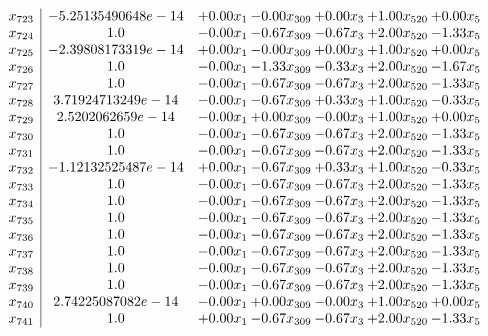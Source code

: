 \documentclass[8pt]{article}
\begin{document}
\[\begin{array}{c| c c@{\hskip 2pt} c@{\hskip 2pt} c@{\hskip 2pt} c@{\hskip 2pt} c@{\hskip 2pt} }
 x_{723}   &  -5.25135490648e-14 & +  0.00 x_{1} & -0.00 x_{309} & +  0.00 x_{3} & +  1.00 x_{520} & +  0.00 x_{5}\\
 x_{724}   &  1.0 & -0.00 x_{1} & -0.67 x_{309} & -0.67 x_{3} & +  2.00 x_{520} & -1.33 x_{5}\\
 x_{725}   &  -2.39808173319e-14 & +  0.00 x_{1} & -0.00 x_{309} & +  0.00 x_{3} & +  1.00 x_{520} & +  0.00 x_{5}\\
 x_{726}   &  1.0 & -0.00 x_{1} & -1.33 x_{309} & -0.33 x_{3} & +  2.00 x_{520} & -1.67 x_{5}\\
 x_{727}   &  1.0 & -0.00 x_{1} & -0.67 x_{309} & -0.67 x_{3} & +  2.00 x_{520} & -1.33 x_{5}\\
 x_{728}   &  3.71924713249e-14 & -0.00 x_{1} & -0.67 x_{309} & +  0.33 x_{3} & +  1.00 x_{520} & -0.33 x_{5}\\
 x_{729}   &  2.5202062659e-14 & -0.00 x_{1} & +  0.00 x_{309} & -0.00 x_{3} & +  1.00 x_{520} & +  0.00 x_{5}\\
 x_{730}   &  1.0 & -0.00 x_{1} & -0.67 x_{309} & -0.67 x_{3} & +  2.00 x_{520} & -1.33 x_{5}\\
 x_{731}   &  1.0 & -0.00 x_{1} & -0.67 x_{309} & -0.67 x_{3} & +  2.00 x_{520} & -1.33 x_{5}\\
 x_{732}   &  -1.12132525487e-14 & +  0.00 x_{1} & -0.67 x_{309} & +  0.33 x_{3} & +  1.00 x_{520} & -0.33 x_{5}\\
 x_{733}   &  1.0 & -0.00 x_{1} & -0.67 x_{309} & -0.67 x_{3} & +  2.00 x_{520} & -1.33 x_{5}\\
 x_{734}   &  1.0 & -0.00 x_{1} & -0.67 x_{309} & -0.67 x_{3} & +  2.00 x_{520} & -1.33 x_{5}\\
 x_{735}   &  1.0 & -0.00 x_{1} & -0.67 x_{309} & -0.67 x_{3} & +  2.00 x_{520} & -1.33 x_{5}\\
 x_{736}   &  1.0 & -0.00 x_{1} & -0.67 x_{309} & -0.67 x_{3} & +  2.00 x_{520} & -1.33 x_{5}\\
 x_{737}   &  1.0 & -0.00 x_{1} & -0.67 x_{309} & -0.67 x_{3} & +  2.00 x_{520} & -1.33 x_{5}\\
 x_{738}   &  1.0 & -0.00 x_{1} & -0.67 x_{309} & -0.67 x_{3} & +  2.00 x_{520} & -1.33 x_{5}\\
 x_{739}   &  1.0 & -0.00 x_{1} & -0.67 x_{309} & -0.67 x_{3} & +  2.00 x_{520} & -1.33 x_{5}\\
 x_{740}   &  2.74225087082e-14 & -0.00 x_{1} & +  0.00 x_{309} & -0.00 x_{3} & +  1.00 x_{520} & +  0.00 x_{5}\\
 x_{741}   &  1.0 & +  0.00 x_{1} & -0.67 x_{309} & -0.67 x_{3} & +  2.00 x_{520} & -1.33 x_{5}\\

\end{array}\]
\end{document}
